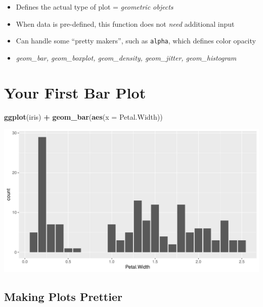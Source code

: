 \documentclass[
]{book}
\newenvironment{Shaded}{\begin{snugshade}}{\end{snugshade}}
\newcommand{\AttributeTok}[1]{\textcolor[rgb]{0.13,0.29,0.53}{#1}}
\newcommand{\FunctionTok}[1]{\textcolor[rgb]{0.13,0.29,0.53}{\textbf{#1}}}
\newcommand{\NormalTok}[1]{#1}
\newcommand{\SpecialCharTok}[1]{\textcolor[rgb]{0.81,0.36,0.00}{\textbf{#1}}}
\providecommand{\tightlist}{%
  \setlength{\itemsep}{0pt}\setlength{\parskip}{0pt}}
\begin{document}
\begin{itemize}
\tightlist
\item
  Defines the actual type of plot = \emph{geometric objects}
\item
  When data is pre-defined, this function does not \emph{need} additional input
\item
  Can handle some ``pretty makers'', such as \texttt{alpha}, which defines color opacity
\item
  \emph{geom\_bar, geom\_boxplot, geom\_density, geom\_jitter, geom\_histogram}
\end{itemize}

\section{Your First Bar Plot}\label{your-first-bar-plot}

\begin{Shaded}
\begin{Highlighting}[]
\FunctionTok{ggplot}\NormalTok{(iris) }\SpecialCharTok{+} 
  \FunctionTok{geom\_bar}\NormalTok{(}\FunctionTok{aes}\NormalTok{(}\AttributeTok{x =}\NormalTok{ Petal.Width)) }
\end{Highlighting}
\end{Shaded}

\begin{flushleft}\includegraphics{_main_files/figure-html/unnamed-chunk-32-1} \end{flushleft}

\subsection{Making Plots Prettier}\label{making-plots-prettier}
\end{document}
